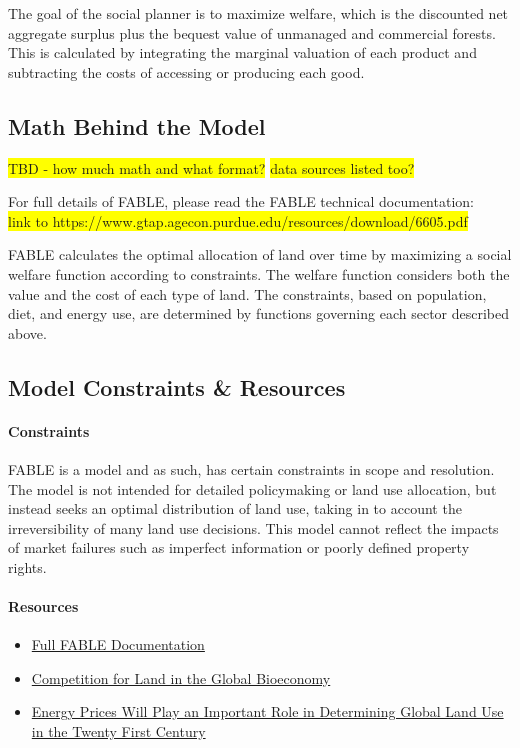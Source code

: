 \documentclass[10pt]{article}
\newcommand{\hilight}[1]{\colorbox{yellow}{#1}}
\begin{document}
The goal of the social planner is to maximize welfare, which is the discounted net aggregate surplus plus the bequest value of unmanaged and commercial forests. This is calculated by integrating the marginal valuation of each product and subtracting the costs of accessing or producing each good.


\subsection{Math Behind the Model}

\hilight{TBD - how much math and what format?}
\hilight{data sources listed too?}

For full details of FABLE, please read the FABLE technical documentation:\\
\hilight{link to https://www.gtap.agecon.purdue.edu/resources/download/6605.pdf}

FABLE calculates the optimal allocation of land over time by maximizing a social welfare function according to constraints. The welfare function considers both the value and the cost of each type of land. The constraints, based on population, diet, and energy use, are determined by functions governing each sector described above. 




\subsection{Model Constraints \& Resources}
\paragraph{Constraints}
FABLE is a model and as such, has certain constraints in scope and resolution. The model is not intended for detailed policymaking or land use allocation, but instead seeks an optimal distribution of land use, taking in to account the irreversibility of many land use decisions. This model cannot reflect the impacts of market failures such as imperfect information or poorly defined property rights.

\paragraph{Resources}
\begin{itemize}
\item \href{https://www.gtap.agecon.purdue.edu/resources/download/6605.pdf}{Full FABLE Documentation}
\item \href{https://www.gtap.agecon.purdue.edu/resources/download/6047.pdf}{Competition for Land in the Global Bioeconomy}
\item \href{http://iopscience.iop.org/1748-9326/8/1/014014/pdf/1748-9326_8_1_014014.pdf}{Energy Prices Will Play an Important Role in Determining Global Land Use in the Twenty First Century}
\end{itemize}
\end{document}
